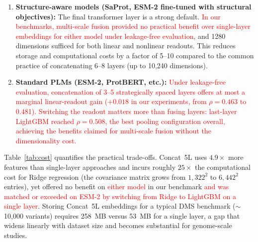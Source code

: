 \documentclass[11pt,a4paper]{article}
\newcommand{\revised}[1]{\textcolor{red}{#1}}
\begin{document}
\begin{enumerate}
    \item \textbf{Structure-aware models (SaProt, ESM-2 fine-tuned with structural
    objectives):} The final transformer layer is a strong default. \revised{In our
    benchmarks, multi-scale fusion provided no practical benefit over single-layer
    embeddings for either model under leakage-free evaluation}, and 1280 dimensions
    sufficed for both linear and nonlinear readouts.
    This reduces
    storage and computational costs by a factor of 5--10 compared to the common
    practice of concatenating 6--8 layers (up to 10,240 dimensions).

    \item \textbf{Standard PLMs (ESM-2, ProtBERT, etc.):} \revised{Under leakage-free
    evaluation, concatenation of 3--5 strategically spaced layers offers at most a
    marginal linear-readout gain ($+0.018$ in our experiments, from $\rho = 0.463$
    to 0.481). Switching the readout matters more than fusing layers: last-layer
    LightGBM reached $\rho = 0.508$, the best pooling configuration overall,
    achieving the benefits claimed for multi-scale fusion without the dimensionality
    cost.}
\end{enumerate}

Table~\ref{tab:cost} quantifies the practical trade-offs. Concat~5L uses
$4.9\times$ more features than single-layer approaches and incurs roughly
$25\times$ the computational cost for Ridge regression (the covariance matrix
grows from $1{,}322^2$ to $6{,}442^2$ entries), yet offered no benefit on
\revised{either model} in our benchmark \revised{and was matched or exceeded on
ESM-2 by switching from Ridge to LightGBM on a single layer}. Storing Concat~5L embeddings for a typical DMS
benchmark ($\sim$10,000 variants) requires 258~MB versus 53~MB for a single
layer, a gap that widens linearly with dataset size and becomes substantial
for genome-scale studies.
\end{document}
